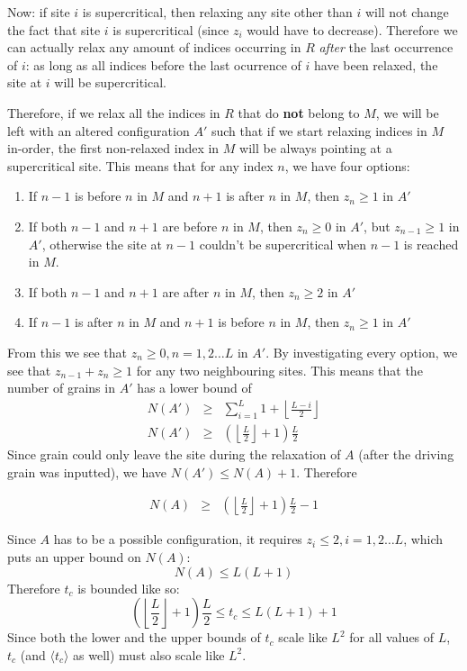 \documentclass[a4paper,12pt]{article}
\begin{document}
Now: if site $i$ is supercritical, then relaxing any site other than $i$ will not change the fact that site $i$ is supercritical (since $z_i$ would have to decrease). Therefore we can actually relax any amount of indices occurring in $R$ \textit{after} the last occurrence of $i$: as long as all indices before the last ocurrence of $i$ have been relaxed, the site at $i$ will be supercritical.

Therefore, if we relax all the indices in $R$ that do \textbf{not} belong to $M$, we will be left with an altered configuration $A'$ such that if we start relaxing indices in $M$ in-order, the first non-relaxed index in $M$ will be always pointing at a supercritical site. This means that for any index $n$, we have four options:
\begin{enumerate}
\item If $n-1$ is before $n$ in $M$ and $n+1$ is after $n$ in $M$, then $z_n\geq 1$ in $A'$
\item If both $n-1$ and $n+1$ are before $n$ in $M$, then $z_n\geq 0$ in $A'$, but $z_{n-1}\geq 1$ in $A'$, otherwise the site at $n-1$ couldn't be supercritical when $n-1$ is reached in $M$.
\item If both $n-1$ and $n+1$ are after $n$ in $M$, then $z_n\geq 2$ in $A'$
\item If $n-1$ is after $n$ in $M$ and $n+1$ is before $n$ in $M$, then $z_n\geq 1$ in $A'$
\end{enumerate}

From this we see that $z_n\geq 0, n=1, 2\dots L$ in $A'$. By investigating every option, we see that $z_{n-1}+z_n\geq 1$ for any two neighbouring sites. This means that the number of grains in $A'$ has a lower bound of
\begin{eqnarray}
N(A')&\geq & \sum_{i=1}^{L}1+\left \lfloor{\frac{L-i}{2}}\right\rfloor\\
N(A')&\geq &\left(\left \lfloor{\frac{L}{2}}\right\rfloor +1\right)\frac{L}{2}
\end{eqnarray}
Since grain could only leave the site during the relaxation of $A$ (after the driving grain was inputted), we have $N(A')\leq N(A)+1$. Therefore

\begin{eqnarray}
N(A)&\geq &\left(\left \lfloor{\frac{L}{2}}\right\rfloor +1\right)\frac{L}{2}-1
\end{eqnarray}

Since $A$ has to be a possible configuration, it requires $z_i\leq 2, i=1, 2\dots L$, which puts an upper bound on $N(A)$:
$$N(A)\leq L(L+1)$$
Therefore $t_c$ is bounded like so:
$$\left(\left \lfloor{\frac{L}{2}}\right\rfloor +1\right)\frac{L}{2}\leq t_c \leq L(L+1)+1$$
Since both the lower and the upper bounds of $t_c$ scale like $L^2$ for all values of $L$, $t_c$ (and $\langle t_c\rangle$ as well) must also scale like $L^2$.
\end{document}
